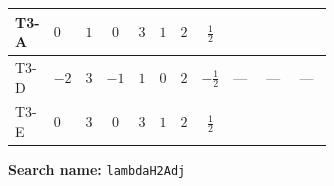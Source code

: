 \documentclass[8pt]{article}
\begin{document}
\begin{landscape}
\begin{longtable}{@{}llcccccc >{\raggedright\arraybackslash}p{0.21\linewidth} >{\raggedright\arraybackslash}p{0.21\linewidth} >{\raggedright\arraybackslash}p{0.21\linewidth}@{}}
\midrule
T3-A & $0$ & $1$ & $0$ & $3$ & $1$ & $2$ & $\frac{1}{2}$ & \scriptsize\adjustbox{max width=\linewidth}{$\begin{gathered} +8 {\lambda_{H2}} {\lambda_{H2}^{\rm Adj}}\end{gathered}$} & \scriptsize\adjustbox{max width=\linewidth}{$\begin{gathered} +2 {\lambda_{H2}^{\rm Adj}} {\lambda_{S_2}}\end{gathered}$} & \scriptsize\adjustbox{max width=\linewidth}{$\begin{gathered} {\lambda_{H2}^{\rm Adj}} (6 \operatorname{Tr}\!\left({Y_d}\,\left({Y_d}\right)^{\dagger}\right)+2 \operatorname{Tr}\!\left({Y_e}\,\left({Y_e}\right)^{\dagger}\right)+6 \operatorname{Tr}\!\left({Y_u}\,\left({Y_u}\right)^{\dagger}\right)+16 {\lambda_{S_2}^{\rm Adj}})\end{gathered}$} \\
\midrule
T3-D & $-2$ & $3$ & $-1$ & $1$ & $0$ & $2$ & $-\frac{1}{2}$ & --- & --- & --- \\
\midrule
T3-E & $0$ & $3$ & $0$ & $3$ & $1$ & $2$ & $\frac{1}{2}$ & \scriptsize\adjustbox{max width=\linewidth}{$\begin{gathered} +8 {\lambda_{H2}} {\lambda_{H2}^{\rm Adj}}\end{gathered}$} & \scriptsize\adjustbox{max width=\linewidth}{$\begin{gathered} +2 {\lambda_{H2}^{\rm Adj}} {\lambda_{S_2}}\end{gathered}$} & \scriptsize\adjustbox{max width=\linewidth}{$\begin{gathered} {\lambda_{H2}^{\rm Adj}} (6 \operatorname{Tr}\!\left({Y_d}\,\left({Y_d}\right)^{\dagger}\right)+2 \operatorname{Tr}\!\left({Y_e}\,\left({Y_e}\right)^{\dagger}\right)+6 \operatorname{Tr}\!\left({Y_u}\,\left({Y_u}\right)^{\dagger}\right)+16 {\lambda_{S_2}^{\rm Adj}})\end{gathered}$} \\
\midrule
\bottomrule
\end{longtable}
\clearpage
\noindent\textbf{Search name: }\texttt{lambdaH2Adj}\par\smallskip

\end{landscape}
\end{document}
